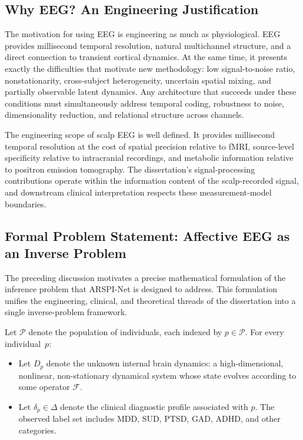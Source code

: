\subsection{Why EEG? An Engineering Justification}

The motivation for using EEG is engineering as much as physiological. EEG provides millisecond temporal resolution, natural multichannel structure, and a direct connection to transient cortical dynamics. At the same time, it presents exactly the difficulties that motivate new methodology: low signal-to-noise ratio, nonstationarity, cross-subject heterogeneity, uncertain spatial mixing, and partially observable latent dynamics. Any architecture that succeeds under these conditions must simultaneously address temporal coding, robustness to noise, dimensionality reduction, and relational structure across channels.

The engineering scope of scalp EEG is well defined. It provides millisecond temporal resolution at the cost of spatial precision relative to fMRI, source-level specificity relative to intracranial recordings, and metabolic information relative to positron emission tomography. The dissertation's signal-processing contributions operate within the information content of the scalp-recorded signal, and downstream clinical interpretation respects these measurement-model boundaries.

\subsection{Formal Problem Statement: Affective EEG as an Inverse Problem}
\label{sec:inverse_problem}

The preceding discussion motivates a precise mathematical formulation of the inference problem that ARSPI-Net is designed to address. This formulation unifies the engineering, clinical, and theoretical threads of the dissertation into a single inverse-problem framework.

Let $\mathcal{P}$ denote the population of individuals, each indexed by $p \in \mathcal{P}$. For every individual~$p$:
\begin{itemize}
    \item Let $D_p$ denote the unknown internal brain dynamics: a high-dimensional, nonlinear, non-stationary dynamical system whose state evolves according to some operator $\mathcal{F}$.
    \item Let $\delta_p \in \Delta$ denote the clinical diagnostic profile associated with $p$. The observed label set includes MDD, SUD, PTSD, GAD, ADHD, and other categories.
\end{itemize}

